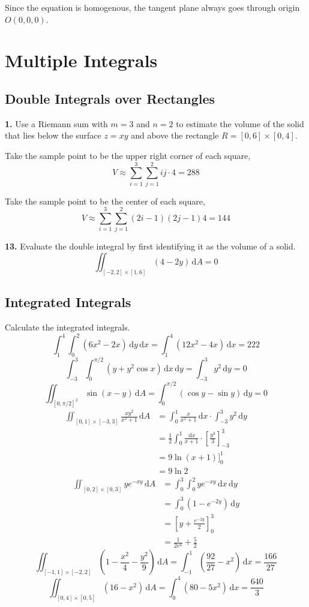 \documentclass[a4paper,12pt]{article}
\newcommand{\ud}{\,\mathrm{d}}
\newcommand{\exercise}[1]{\noindent\textbf{#1.}}
\begin{document}
Since the equation is homogenous, the tangent plane always goes through origin
$O(0, 0, 0)$.

\section{Multiple Integrals}
\subsection{Double Integrals over Rectangles}
\exercise{1} Use a Riemann sum with $m=3$ and $n=2$ to estimate the volume
of the solid that lies below the surface $z = xy$ and above the rectangle
$R = [0, 6] \times [0, 4]$.

Take the sample point to be the upper right corner of each square,
\[V \approx \sum_{i=1}^3\sum_{j=1}^2 ij \cdot 4 = 288\tag{a}\]

Take the sample point to be the center of each square,
\[V \approx \sum_{i=1}^3\sum_{j=1}^2 (2i-1)(2j-1)4 = 144\tag{b}\]

\exercise{13} Evaluate the double integral by first identifying it
as the volume of a solid.
\[\iint_{[-2,2]\times[1,6]}(4 - 2y)\ud A = 0\]

\subsection{Integrated Integrals}
Calculate the integrated integrals.
\[\int_1^4\int_0^2(6x^2 - 2x)\ud y\ud x
= \int_1^4(12x^2 - 4x)\ud x = 222\tag{3}\]
\[\int_{-3}^3\int_0^{\pi/2}(y + y^2\cos x)\ud x\ud y
= \int_{-3}^3 y^2\ud y = 0\tag{7}\]
\[\iint_{[0,\pi/2]^2}\sin(x - y)\ud A
= \int_0^{\pi/2}(\cos y - \sin y)\ud y = 0\tag{15}\]
\begin{align*}
  \iint_{[0,1]\times[-3,3]}\frac{xy^2}{x^2 + 1}\ud A
  &= \int_0^1\frac{x}{x^2 + 1}\ud x \cdot \int_{-3}^3 y^2\ud y\\
  &= \frac{1}{2}\int_0^1\frac{\ud x}{x+1}
     \cdot \left[\frac{y^3}{3}\right]_{-3}^3\\
  &= 9\ln(x + 1)\big]_0^1\\
  &= 9\ln 2\tag{17}
\end{align*}
\begin{align*}
  \iint_{[0,2]\times[0,3]}ye^{-xy}\ud A
  &= \int_0^3\int_0^2 ye^{-xy}\ud x\ud y\\
  &= \int_0^3(1 - e^{-2y})\ud y\\
  &= \left[y + \frac{e^{-2y}}{2}\right]_0^3\\
  &= \frac{1}{2e^6} + \frac{5}{2}\tag{21}
\end{align*}
\[\iint_{[-1,1]\times[-2,2]}\left(1-\frac{x^2}{4}-\frac{y^2}{9}\right)\ud A
= \int_{-1}^1\left(\frac{92}{27} - x^2\right)\ud x = \frac{166}{27}\tag{27}\]
\[\iint_{[0,4]\times[0,5]}(16 - x^2)\ud A
= \int_0^4(80 - 5x^2)\ud x = \frac{640}{3}\tag{30}\]
\end{document}
